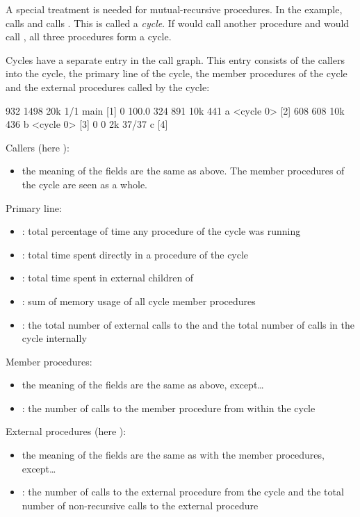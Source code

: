 A special treatment is needed for mutual-recursive procedures. In the example,
 calls  and  calls . This is called a \textit{cycle}.
If  would call another procedure  and  would call , all three
procedures form a cycle.

Cycles have a separate entry in the call graph.
This entry consists of the callers into the cycle, the primary line of the cycle,
the member procedures of the cycle and the external procedures called by the cycle:

\begin{example}
            932   1498  20k      1/1      main [1]
 0  100.0%
            324    891  10k      441      a <cycle 0> [2]
            608    608  10k      436      b <cycle 0> [3]
              0      0   2k    37/37      c [4]
\end{example}

Callers (here ):
\begin{itemize}
	\item the meaning of the fields are the same
	as above. The member procedures of the cycle are seen as a whole.
\end{itemize}

Primary line:
\begin{itemize}
	\item {}:
		total percentage of time any procedure of the cycle was running
	\item {}:
		total time spent directly in a procedure of the cycle
	\item {}:
		total time spent in external children of 
	\item {}:
		sum of memory usage of all cycle member procedures
	\item {}:
		the total number of external calls to the  and the total number
		of calls in the cycle internally
\end{itemize}

Member procedures:
\begin{itemize}
	\item the meaning of the fields are the same as above, except\ldots
	\item {}: the number of calls to the member procedure from within the cycle
\end{itemize}

External procedures (here ):
\begin{itemize}
	\item the meaning of the fields are the same as with the member procedures, except\ldots
	\item {}: the number of calls to the external procedure from the cycle
		and
		the total number of non-recursive calls to the external procedure
\end{itemize}


